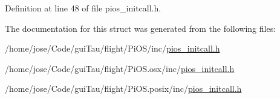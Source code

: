 Definition at line 48 of file pios\-\_\-initcall.\-h.



The documentation for this struct was generated from the following files\-:\begin{DoxyCompactItemize}
\item 
/home/jose/\-Code/gui\-Tau/flight/\-Pi\-O\-S/inc/\hyperlink{inc_2pios__initcall_8h}{pios\-\_\-initcall.\-h}\item 
/home/jose/\-Code/gui\-Tau/flight/\-Pi\-O\-S.\-osx/inc/\hyperlink{osx_2inc_2pios__initcall_8h}{pios\-\_\-initcall.\-h}\item 
/home/jose/\-Code/gui\-Tau/flight/\-Pi\-O\-S.\-posix/inc/\hyperlink{posix_2inc_2pios__initcall_8h}{pios\-\_\-initcall.\-h}\end{DoxyCompactItemize}
